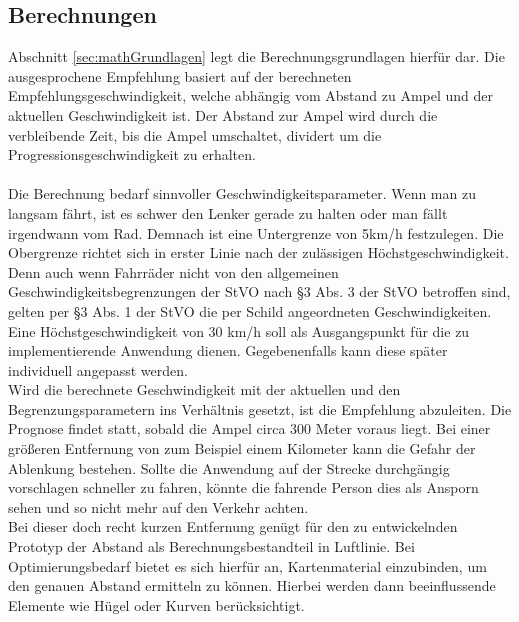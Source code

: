 \subsection{Berechnungen}
Abschnitt \ref{sec:mathGrundlagen} legt die Berechnungsgrundlagen hierfür dar. Die ausgesprochene Empfehlung basiert auf der berechneten Empfehlungsgeschwindigkeit, welche abhängig vom Abstand zu Ampel und der aktuellen Geschwindigkeit ist. Der Abstand zur Ampel wird durch die verbleibende Zeit, bis die Ampel umschaltet, dividert um die Progressionsgeschwindigkeit zu erhalten.\\\\
Die Berechnung bedarf sinnvoller Geschwindigkeitsparameter. Wenn man zu langsam fährt, ist es schwer den Lenker gerade zu halten oder man fällt irgendwann vom Rad. Demnach ist eine Untergrenze von 5km/h festzulegen. Die Obergrenze richtet sich in erster Linie nach der zulässigen Höchstgeschwindigkeit. Denn auch wenn Fahrräder nicht von den allgemeinen Geschwindigkeitsbegrenzungen der StVO nach \S 3 Abs. 3 der StVO betroffen sind, gelten per \S 3 Abs. 1 der StVO die per Schild angeordneten Geschwindigkeiten. Eine Höchstgeschwindigkeit von 30 km/h soll als Ausgangspunkt für die zu implementierende Anwendung dienen. Gegebenenfalls kann diese später individuell angepasst werden. \\
Wird die berechnete Geschwindigkeit mit der aktuellen und den Begrenzungsparametern ins Verhältnis gesetzt, ist die Empfehlung abzuleiten. Die Prognose findet statt, sobald die Ampel circa 300 Meter voraus liegt. Bei einer größeren Entfernung von zum Beispiel einem Kilometer kann die Gefahr der Ablenkung bestehen. Sollte die Anwendung auf der Strecke durchgängig vorschlagen schneller zu fahren, könnte die fahrende Person dies als Ansporn sehen und so nicht mehr auf den Verkehr achten.\\ 
Bei dieser doch recht kurzen Entfernung genügt für den zu entwickelnden Prototyp der Abstand als Berechnungsbestandteil in Luftlinie. Bei Optimierungsbedarf bietet es sich hierfür an, Kartenmaterial einzubinden, um den genauen Abstand ermitteln zu können. Hierbei werden dann beeinflussende Elemente wie Hügel oder Kurven berücksichtigt.
